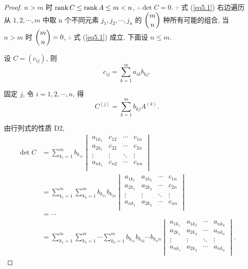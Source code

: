 \documentclass[color=black,device=normal,lang=cn,mode=geye]{elegantnote}
\begin{document}
\begin{proof}    
    $n>m$ 时 $\operatorname{rank} C\leq\operatorname{rank} A\leq m<n$, $\therefore\det C=0$. $\because$ 式 (\ref{eq5.1}) 右边遍历从 $1,2,\cdots,m$ 中取 n 个不同元素 $j_1,j_2,\cdots,j_n$ 的 $\dbinom{m}{n}$ 种所有可能的组合, 当 $n>m$ 时 $\dbinom{m}{n}=0$, $\therefore$ 式 (\ref{eq5.1}) 成立. 下面设 $n\leq m$.
    
    设 $C=(c_{ij})$, 则
    \[c_{ij}=\sum_{k=1}^ma_{ik}b_{kj}.\]

    固定 $j$, 令 $i=1,2,\cdots,n$, 得
    \[C^{(j)}=\sum_{k=1}^mb_{kj}A^{(k)}.\]

    由行列式的性质 D2,
    \begin{align*}
        \det C & =\sum_{k_1=1}^mb_{k_11}\begin{vmatrix}
            a_{1k_1} & c_{12} & \cdots & c_{1n} \\
            a_{2k_1} & c_{22} & \cdots & c_{2n} \\
            \vdots & \vdots & \ddots & \vdots \\
            a_{nk_1} & c_{n2} & \cdots & c_{nn} \\
        \end{vmatrix} \\
            & =\sum_{k_1=1}^m\sum_{k_2=1}^mb_{k_11}b_{k_22}\begin{vmatrix}
            a_{1k_1} & a_{1k_2} & \cdots & c_{1n} \\
            a_{2k_1} & a_{2k_2} & \cdots & c_{2n} \\
            \vdots & \vdots & \ddots & \vdots \\
            a_{nk_1} & a_{2k_2} & \cdots & c_{nn} \\
        \end{vmatrix} \\
            & =\cdots \\
            & =\sum_{k_1=1}^m\sum_{k_2=1}^m\cdots\sum_{k_n=1}^mb_{k_11}b_{k_22}\cdots b_{k_nn}\begin{vmatrix}
            a_{1k_1} & a_{1k_2} & \cdots & a_{nk_n} \\
            a_{2k_1} & a_{2k_2} & \cdots & a_{nk_n} \\
            \vdots & \vdots & \ddots & \vdots \\
            a_{nk_1} & a_{2k_2} & \cdots & a_{nk_n} \\
        \end{vmatrix}.
    \end{align*}


\end{proof}
\end{document}

